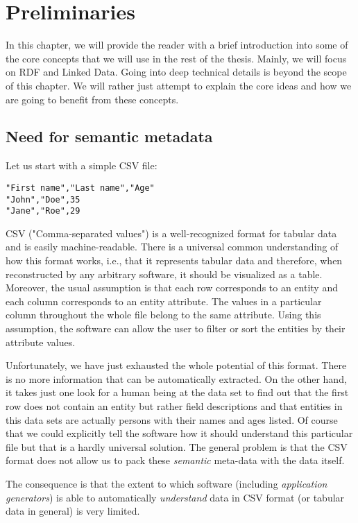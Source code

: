 \chapter{Preliminaries}
\label{chap:preliminaries}

In this chapter, we will provide the reader with a brief introduction into some of the core concepts that we will use in the rest of the thesis. Mainly, we will focus on RDF and Linked Data. Going into deep technical details is beyond the scope of this chapter. We will rather just attempt to explain the core ideas and how we are going to benefit from these concepts.

\section{Need for semantic metadata}

Let us start with a simple CSV file:

\begin{verbatim}
"First name","Last name","Age"
"John","Doe",35
"Jane","Roe",29
\end{verbatim}

CSV ("Comma-separated values") \cite{csv} is a well-recognized format for tabular data and is easily machine-readable. There is a universal common understanding of how this format works, i.e., that it represents tabular data and therefore, when reconstructed by any arbitrary software, it should be visualized as a table. Moreover, the usual assumption is that each row corresponds to an entity and each column corresponds to an entity attribute. The values in a particular column throughout the whole file belong to the same attribute. Using this assumption, the software can allow the user to filter or sort the entities by their attribute values.

Unfortunately, we have just exhausted the whole potential of this format. There is no more information that can be automatically extracted. On the other hand, it takes just one look for a human being at the data set to find out that the first row does not contain an entity but rather field descriptions and that entities in this data sets are actually persons with their names and ages listed. Of course that we could explicitly tell the software how it should understand this particular file but that is a hardly universal solution. The general problem is that the CSV format does not allow us to pack these \emph{semantic} meta-data with the data itself.

The consequence is that the extent to which software (including \emph{application generators}) is able to automatically \emph{understand} data in CSV format (or tabular data in general) is very limited.

